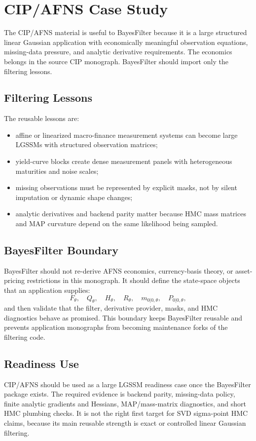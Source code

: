 \chapter{CIP/AFNS Case Study}
\label{ch:bf-cip-afns-case-study}

The CIP/AFNS material is useful to BayesFilter because it is a large structured
linear Gaussian application with economically meaningful observation equations,
missing-data pressure, and analytic derivative requirements.  The economics
belongs in the source CIP monograph.  BayesFilter should import only the
filtering lessons.

\section{Filtering Lessons}
\label{sec:bf-cip-filtering-lessons}

The reusable lessons are:
\begin{itemize}
  \item affine or linearized macro-finance measurement systems can become large
    LGSSMs with structured observation matrices;
  \item yield-curve blocks create dense measurement panels with heterogeneous
    maturities and noise scales;
  \item missing observations must be represented by explicit masks, not by
    silent imputation or dynamic shape changes;
  \item analytic derivatives and backend parity matter because HMC mass
    matrices and MAP curvature depend on the same likelihood being sampled.
\end{itemize}

\section{BayesFilter Boundary}
\label{sec:bf-cip-boundary}

BayesFilter should not re-derive AFNS economics, currency-basis theory, or
asset-pricing restrictions in this monograph.  It should define the state-space
objects that an application supplies:
\[
  F_\theta,\quad Q_\theta,\quad H_\theta,\quad R_\theta,\quad
  m_{0|0,\theta},\quad P_{0|0,\theta},
\]
and then validate that the filter, derivative provider, masks, and HMC
diagnostics behave as promised.  This boundary keeps BayesFilter reusable and
prevents application monographs from becoming maintenance forks of the
filtering code.

\section{Readiness Use}
\label{sec:bf-cip-readiness-use}

CIP/AFNS should be used as a large LGSSM readiness case once the BayesFilter
package exists.  The required evidence is backend parity, missing-data policy,
finite analytic gradients and Hessians, MAP/mass-matrix diagnostics, and short
HMC plumbing checks.  It is not the right first target for SVD sigma-point HMC
claims, because its main reusable strength is exact or controlled linear
Gaussian filtering.
